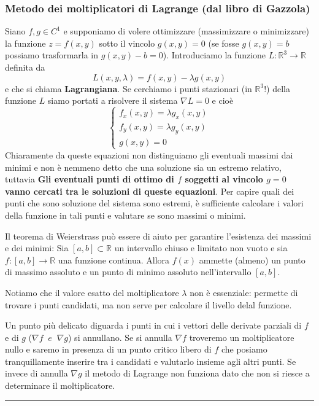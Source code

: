 \subsubsection{Metodo dei moltiplicatori di Lagrange (dal libro di Gazzola)}
\begin{tcolorbox}
Siano $f,g \in C^1$ e supponiamo di volere ottimizzare (massimizzare o minimizzare) la funzione $z = f(x,y)$ sotto il vincolo $g(x,y) = 0$ (se fosse $g(x,y) = b$ possiamo trasformarla in $g(x,y) - b = 0$). Introduciamo la funzione $L : \mathbb{R}^3 \rightarrow \mathbb{R}$ definita da
\[
    L(x,y,\lambda) = f(x,y) - \lambda g(x,y)
\]
e che si chiama \textbf{Lagrangiana}. Se cerchiamo i punti stazionari (in $\mathbb{R}^3$!) della funzione $L$ siamo portati a risolvere il sistema $\nabla L = 0$ e cioè
\[
    \begin{cases}
        f_x(x,y) = \lambda g_x(x,y) \\  
        f_y (x,y) = \lambda g_y(x,y)\\
        g(x,y) = 0
    \end{cases}
\]
Chiaramente da queste equazioni non distinguiamo gli eventuali massimi dai minimi e non è nemmeno detto che una soluzione sia un estremo relativo, tuttavia 
\textbf{Gli eventuali punti di ottimo di $f$ soggetti al vincolo $g = 0$ vanno cercati tra le soluzioni di queste equazioni}.\newline
Per capire quali dei punti che sono soluzione del sistema sono estremi, è sufficiente calcolare i valori della funzione in tali punti e valutare se sono massimi o minimi.
\end{tcolorbox}
\begin{tcolorbox}
Il teorema di Weierstrass può essere di aiuto per garantire l'esistenza dei massimi e dei minimi: Sia $[a,b]\subset \mathbb {R}$ un intervallo chiuso e limitato non vuoto e sia $f\colon [a,b]\to \mathbb {R}$ una funzione continua. Allora $f(x)$ ammette (almeno) un punto di massimo assoluto e un punto di minimo assoluto nell'intervallo $[a,b]$.
\end{tcolorbox}
\begin{tcolorbox}
Notiamo che il valore esatto del moltiplicatore $\lambda$ non è essenziale: permette di trovare i punti candidati, ma non serve per calcolare il livello delal funzione.
\end{tcolorbox}
\begin{tcolorbox}
Un punto più delicato diguarda i punti in cui i vettori delle derivate parziali di $f$ e di $g$ ($\nabla f \;\;e \;\; \nabla g$) si annullano. Se si annulla $\nabla f$ troveremo un moltiplicatore nullo e saremo in presenza di un punto critico libero di $f$ che posiamo tranquillamente inserire tra i candidati e valutarlo insieme agli altri punti. Se invece di annulla $\nabla g$ il metodo di Lagrange non funziona dato che non si riesce a determinare il moltiplicatore.
\end{tcolorbox}
\rule{\textwidth}{0,4pt}
